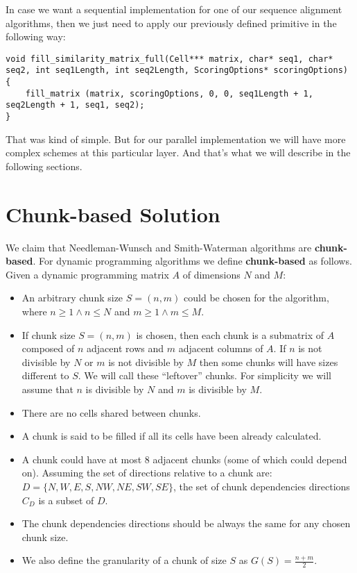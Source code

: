 \documentclass[journal]{IEEEtran}
\begin{document}
In case we want a sequential implementation for one of our  sequence alignment algorithms, then we just need to apply our previously defined primitive in the following way:

\lstset{language=C}
\begin{lstlisting}[linewidth=\columnwidth,breaklines=true]
void fill_similarity_matrix_full(Cell*** matrix, char* seq1, char* seq2, int seq1Length, int seq2Length, ScoringOptions* scoringOptions) 
{
    fill_matrix (matrix, scoringOptions, 0, 0, seq1Length + 1, seq2Length + 1, seq1, seq2);
}
\end{lstlisting}

That was kind of simple. But for our parallel implementation we will have more complex schemes at this particular layer. And that's what we will describe in the following sections.

\section{Chunk-based Solution}

We claim that Needleman-Wunsch and Smith-Waterman algorithms are \textbf{chunk-based}. For dynamic programming algorithms we define \textbf{chunk-based} as follows. Given a dynamic programming matrix $A$ of dimensions $N$ and $M$:

\begin{itemize}
    \item An arbitrary chunk size $S = (n, m)$ could be chosen for the algorithm, where $n \geq 1 \land n \leq N$ and $m \geq 1 \land m \leq M$.
    \item If chunk size $S = (n, m)$ is chosen, then each chunk is a submatrix of $A$ composed of $n$ adjacent rows and $m$ adjacent columns of $A$. If $n$ is not divisible by $N$ or $m$ is not divisible by $M$ then some chunks will have sizes different to $S$. We will call these ``leftover'' chunks. For simplicity we will assume that $n$ is divisible by $N$ and $m$ is divisible by $M$.
    \item There are no cells shared between chunks.
    \item A chunk is said to be filled if all its cells have been already calculated.
    \item A chunk could have at most 8 adjacent chunks (some of which could depend on). Assuming the set of directions relative to a chunk are: $D = \{ N, W, E, S, NW, NE, SW, SE \}$, the set of chunk dependencies directions $C_D$ is a subset of $D$.
    \item The chunk dependencies directions should be always the same for any chosen chunk size.
    \item We also define the granularity of a chunk of size $S$ as $G(S) = \frac{n+m}{2}$.
\end{itemize}
\end{document}
